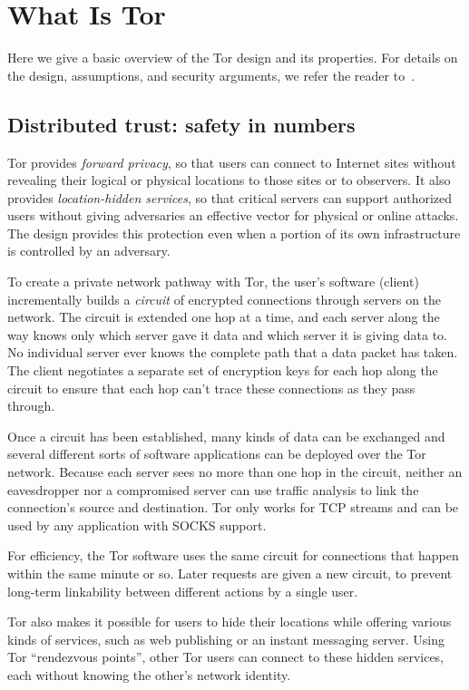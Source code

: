 \documentclass{llncs}
\begin{document}
\section{What Is Tor}
\label{sec:what-is-tor}

Here we give a basic overview of the Tor design and its properties. For
details on the design, assumptions, and security arguments, we refer
the reader to~\cite{tor-design}.

\subsection{Distributed trust: safety in numbers}

Tor provides \emph{forward privacy}, so that users can connect to
Internet sites without revealing their logical or physical locations
to those sites or to observers.  It also provides \emph{location-hidden
services}, so that critical servers can support authorized users without
giving adversaries an effective vector for physical or online attacks.
The design provides this protection even when a portion of its own
infrastructure is controlled by an adversary.

To create a private network pathway with Tor, the user's software (client)
incrementally builds a \emph{circuit} of encrypted connections through
servers on the network. The circuit is extended one hop at a time, and
each server along the way knows only which server gave it data and which
server it is giving data to. No individual server ever knows the complete
path that a data packet has taken. The client negotiates a separate set
of encryption keys for each hop along the circuit to ensure that each
hop can't trace these connections as they pass through.

Once a circuit has been established, many kinds of data can be exchanged
and several different sorts of software applications can be deployed over
the Tor network. Because each server sees no more than one hop in the
circuit, neither an eavesdropper nor a compromised server can use traffic
analysis to link the connection's source and destination. Tor only works
for TCP streams and can be used by any application with SOCKS support.

For efficiency, the Tor software uses the same circuit for connections
that happen within the same minute or so. Later requests are given a new
circuit, to prevent long-term linkability between different actions by
a single user.

Tor also makes it possible for users to hide their locations while
offering various kinds of services, such as web publishing or an instant
messaging server. Using Tor ``rendezvous points'', other Tor users can
connect to these hidden services, each without knowing the other's network
identity.
\end{document}
